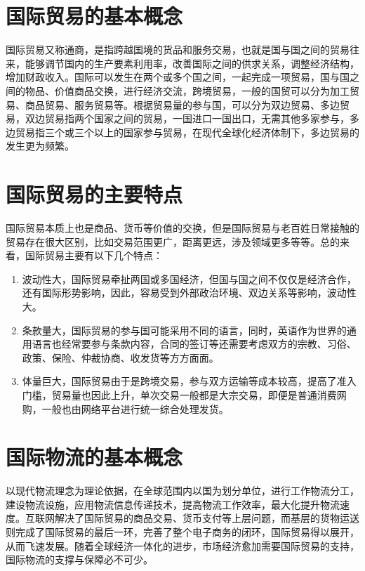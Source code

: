 \section{国际贸易的基本概念}
国际贸易又称通商，是指跨越国境的货品和服务交易，也就是国与国之间的贸易往来，能够调节国内的生产要素利用率，改善国际之间的供求关系，调整经济结构，增加财政收入。国际可以发生在两个或多个国之间，一起完成一项贸易，国与国之间的物品、价值商品交换，进行经济交流，跨境贸易，一般的国贸可以分为加工贸易、商品贸易、服务贸易等。根据贸易量的参与国，可以分为双边贸易、多边贸易，双边贸易指两个国家之间的贸易，一国进口一国出口，无需其他多家参与，多边贸易指三个或三个以上的国家参与贸易，在现代全球化经济体制下，多边贸易的发生更为频繁。
\section{国际贸易的主要特点}
国际贸易本质上也是商品、货币等价值的交换，但是国际贸易与老百姓日常接触的贸易存在很大区别，比如交易范围更广，距离更远，涉及领域更多等等。总的来看，国际贸易主要有以下几个特点：
\vspace{-0.5ex}
\begin{enumerate}[(1)]
\setlength{\itemsep}{0ex}
\item 波动性大，国际贸易牵扯两国或多国经济，但国与国之间不仅仅是经济合作，还有国际形势影响，因此，容易受到外部政治环境、双边关系等影响，波动性大。
\item 条款量大，国际贸易的参与国可能采用不同的语言，同时，英语作为世界的通用语言也经常要参与条款内容，合同的签订等还需要考虑双方的宗教、习俗、政策、保险、仲裁协商、收发货等方方面面。
\item 体量巨大，国际贸易由于是跨境交易，参与双方运输等成本较高，提高了准入门槛，贸易量也因此上升，单次交易一般都是大宗交易，即便是普通消费网购，一般也由网络平台进行统一综合处理发货。
\end{enumerate}
\section{国际物流的基本概念}
以现代物流理念为理论依据，在全球范围内以国为划分单位，进行工作物流分工，建设物流设施，应用物流信息传递技术，提高物流工作效率，最大化提升物流速度。互联网解决了国际贸易的商品交易、货币支付等上层问题，而基层的货物运送则完成了国际贸易的最后一环，完善了整个电子商务的闭环，国际贸易得以展开，从而飞速发展。随着全球经济一体化的进步，市场经济愈加需要国际贸易的支持，国际物流的支撑与保障必不可少。
